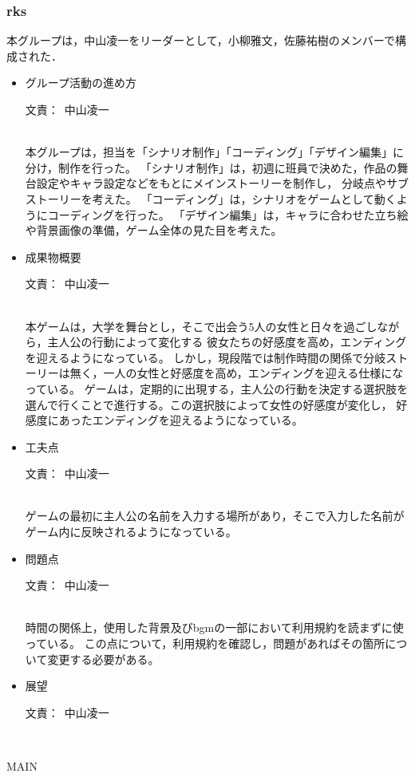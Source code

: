 \documentclass[a4paper]{jarticle}
\newcommand{\resp}[1]{\begin{flushright}文責：~#1\end{flushright}~\\}
\begin{document}
\fi

\subsubsection{rks}
    
    本グループは，中山凌一をリーダーとして，小柳雅文，佐藤祐樹のメンバーで構成された．

    \begin{itemize}
        \item グループ活動の進め方
        
        \resp{中山凌一}

        本グループは，担当を「シナリオ制作」「コーディング」「デザイン編集」に分け，制作を行った。
        「シナリオ制作」は，初週に班員で決めた，作品の舞台設定やキャラ設定などをもとにメインストーリーを制作し，
        分岐点やサブストーリーを考えた。
        「コーディング」は，シナリオをゲームとして動くようにコーディングを行った。
        「デザイン編集」は，キャラに合わせた立ち絵や背景画像の準備，ゲーム全体の見た目を考えた。

        \item 成果物概要
        
        \resp{中山凌一}

        本ゲームは，大学を舞台とし，そこで出会う5人の女性と日々を過ごしながら，主人公の行動によって変化する
        彼女たちの好感度を高め，エンディングを迎えるようになっている。
        しかし，現段階では制作時間の関係で分岐ストーリーは無く，一人の女性と好感度を高め，エンディングを迎える仕様になっている。
        ゲームは，定期的に出現する，主人公の行動を決定する選択肢を選んで行くことで進行する。この選択肢によって女性の好感度が変化し，
        好感度にあったエンディングを迎えるようになっている。

        \item 工夫点
        
        \resp{中山凌一}

        ゲームの最初に主人公の名前を入力する場所があり，そこで入力した名前がゲーム内に反映されるようになっている。

        \item 問題点
        
        \resp{中山凌一}

        時間の関係上，使用した背景及びbgmの一部において利用規約を読まずに使っている。
        この点について，利用規約を確認し，問題があればその箇所について変更する必要がある。

        \item 展望
        
        \resp{中山凌一}


    \end{itemize}

\expandafter\ifx\csname MAIN \endcsname\relax
  
\end{document}
